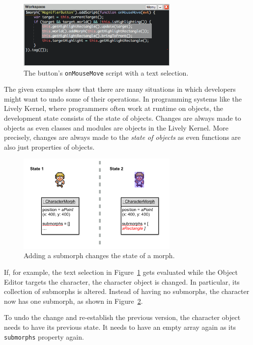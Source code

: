 \begin{figure}[h]
    \centering
    \includegraphics[width=0.7\textwidth]{figures/3_motivation/4_workspaceDoIt.png}
    \caption{The button's \lstinline{onMouseMove} script with a text selection.}
    \label{fig:onMouseOverScript}
\end{figure}

The given examples show that there are many situations in which developers might want to undo some of their operations.
In programming systems like the Lively Kernel, where programmers often work at runtime on objects, the development state consists of the state of objects.
Changes are always made to objects as even classes and modules are objects in the Lively Kernel.
More precisely, changes are always made to the \emph{state of objects} as even functions are also just properties of objects.

\begin{figure}[h]
    \centering
    \includegraphics[width=0.7\textwidth]{figures/3_motivation/5_stateChanges.png}
    \caption{Adding a submorph changes the state of a morph.}
    \label{fig:changedCharacter}
\end{figure}

If, for example, the text selection in Figure~\ref{fig:onMouseOverScript} gets evaluated while the Object Editor targets the character, the character object is changed.
In particular, its collection of submorphs is altered.
Instead of having no submorphs, the character now has one submorph, as shown in Figure~\ref{fig:changedCharacter}.

To undo the change and re-establish the previous version, the character object needs to have its previous state.
It needs to have an empty array again as its \lstinline{submorphs} property again.
